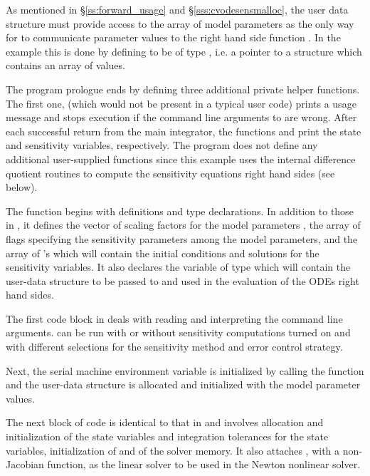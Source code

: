 As mentioned in \S\ref{ss:forward_usage} and \S\ref{sss:cvodesensmalloc}, the user data
structure  must provide access to the array of model parameters 
as the only way for {\cvodes} to communicate parameter values to the right hand side 
function . In the  example this is done by defining  to be 
of type , i.e. a pointer to a structure which contains an array of 
  values.

The program prologue ends by defining three additional private helper functions. The first
one,  (which would not be present in a typical user code) prints a usage
message and stops execution if the command line arguments to  are wrong.
After each successful return from the main {\cvodes} integrator, the functions 
 and  print the state and sensitivity variables,
respectively. The program does not define any additional user-supplied functions 
since this example uses the {\cvodes} internal difference quotient routines to compute
the sensitivity equations right hand sides (see below).

The  function begins with definitions and type declarations. In addition to 
those in , it defines the vector  of  scaling factors for
the model parameters , the array  of  flags specifying
the sensitivity parameters among the model parameters, and the array  of 
's which will contain the initial conditions and solutions for the sensitivity
variables. It also declares the variable  of type  
which will contain the user-data structure to be passed to {\cvodes} and used in the 
evaluation of the ODEs right hand sides.

The first code block in  deals with reading and interpreting the
command line arguments.  can be run with or without sensitivity computations
turned on and with different selections for the sensitivity method and error control strategy.

Next, the serial machine environment variable  is initialized by calling
the {\nvecs} function  and the user-data structure is allocated
and initialized with the model parameter values.

The next block of code is identical to that in  and involves allocation and 
initialization of the state variables and integration tolerances for the state variables,
initialization of  and of the {\cvodes} solver memory. It also attaches {\cvdense},
with a non- Jacobian function, as the linear solver to be used in the Newton 
nonlinear solver.


